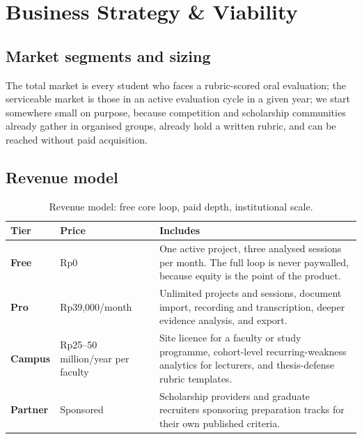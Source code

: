 \section{Business Strategy \& Viability}

\subsection{Market segments and sizing}

The total market is every student who faces a rubric-scored oral evaluation;
the serviceable market is those in an active evaluation cycle in a given year;
we start somewhere small on purpose, because competition and scholarship
communities already gather in organised groups, already hold a written rubric,
and can be reached without paid acquisition.



\subsection{Revenue model}

\begin{table}[htbp]
\centering
\caption{Revenue model: free core loop, paid depth, institutional scale.}
\label{tab:revenue}
{\fontsize{10.5}{13}\selectfont
\begin{tabularx}{\textwidth}{@{}L{2.5cm} L{3.5cm} X@{}}
\toprule
\textbf{Tier} & \textbf{Price} & \textbf{Includes} \\
\midrule
\textbf{Free} & Rp0 &
One active project, three analysed sessions per month. The full loop is
never paywalled, because equity is the point of the product. \\
\addlinespace
\textbf{Pro} & Rp39,000/month &
Unlimited projects and sessions, document import, recording and
transcription, deeper evidence analysis, and export. \\
\addlinespace
\textbf{Campus} & Rp25--50 million/year per faculty &
Site licence for a faculty or study programme, cohort-level recurring-weakness
analytics for lecturers, and thesis-defense rubric templates. \\
\addlinespace
\textbf{Partner} & Sponsored &
Scholarship providers and graduate recruiters sponsoring preparation tracks
for their own published criteria. \\
\bottomrule
\end{tabularx}}
\end{table}

